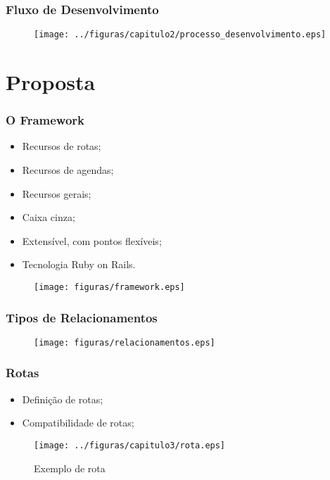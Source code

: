 \documentclass{beamer}
\begin{document}
\begin{frame}
\frametitle{Fluxo de Desenvolvimento}

\begin{figure}[h]
	\centering
	\texttt{[image: ../figuras/capitulo2/processo\_desenvolvimento.eps]}
\end{figure}

\end{frame}

\section{Proposta}

\begin{frame}
\frametitle{O Framework}

\begin{itemize}
	\item Recursos de rotas;
	\item Recursos de agendas;
	\item Recursos gerais;
	\item Caixa cinza;
	\item Extensível, com pontos flexíveis;
	\item Tecnologia Ruby on Rails.
\end{itemize}

\begin{figure}[h]
	\centering
	\texttt{[image: figuras/framework.eps]}
\end{figure}

\end{frame}

\begin{frame}
\frametitle{Tipos de Relacionamentos}

\begin{figure}[h]
	\centering
	\texttt{[image: figuras/relacionamentos.eps]}
\end{figure}

\end{frame}

\begin{frame}
\frametitle{Rotas}

\begin{itemize}
	\item Definição de rotas;
	\item Compatibilidade de rotas;
\end{itemize}

\begin{figure}[!h]
	\centering
	\texttt{[image: ../figuras/capitulo3/rota.eps]}
	\caption[Exemplo de rota]{Exemplo de rota\footnotemark}
	\label{rota}
\end{figure}

\end{frame}
\end{document}
